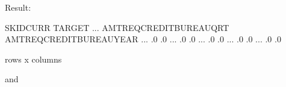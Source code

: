 \documentclass[letterpaper,11pt,english]{sphinxmanual}
\begin{document}
Result:

\begin{sphinxVerbatim}[commandchars=\\\{\}]
   SK\PYGZus{}ID\PYGZus{}CURR  TARGET  ... AMT\PYGZus{}REQ\PYGZus{}CREDIT\PYGZus{}BUREAU\PYGZus{}QRT AMT\PYGZus{}REQ\PYGZus{}CREDIT\PYGZus{}BUREAU\PYGZus{}YEAR
               ...                       .0                        .0
               ...                       .0                        .0
               ...                       .0                        .0
               ...                       .0                        .0
               ...                       .0                        .0

\PYG{o}{[} rows x  columns\PYG{o}{]}
\end{sphinxVerbatim}

and
\begin{quote}

\begin{figure}[htbp]
\centering

\noindent{}
\end{figure}

\begin{figure}[htbp]
\centering

\noindent{}
\end{figure}
\end{quote}
\end{document}
